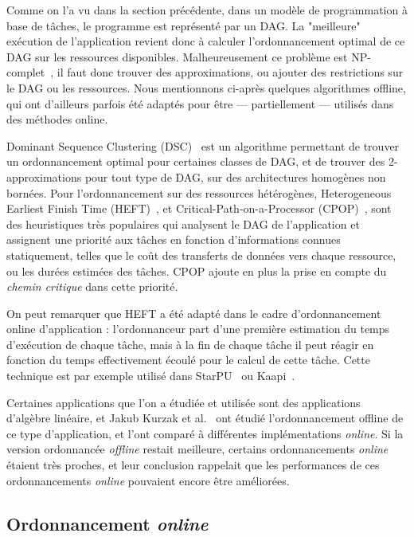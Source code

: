 Comme on l'a vu dans la section précédente, dans un modèle de programmation à base de tâches, le programme est représenté par un DAG.
La "meilleure" exécution de l'application revient donc à calculer l'ordonnancement optimal de ce DAG sur les ressources disponibles.
Malheureusement ce problème est NP-complet~\cite{Cook1971}, il faut donc trouver des approximations, ou ajouter des restrictions sur le DAG ou les ressources.
Nous mentionnons ci-après quelques algorithmes offline, qui ont d'ailleurs parfois été adaptés pour être --- partiellement --- utilisés dans des méthodes online.

Dominant Sequence Clustering (DSC)~\cite{Yang1994} est un algorithme permettant de trouver un ordonnancement optimal pour certaines classes de DAG, et de trouver des 2-approximations pour tout type de DAG, sur des architectures homogènes non bornées.
Pour l'ordonnancement sur des ressources hétérogènes, Heterogeneous Earliest Finish Time (HEFT)~\cite{HEFT}, et Critical-Path-on-a-Processor (CPOP)~\cite{HEFT}, sont des heuristiques très populaires qui analysent le DAG de l'application et assignent une priorité aux tâches en fonction d'informations connues statiquement, telles que le coût des transferts de données vers chaque ressource, ou les durées estimées des tâches.
CPOP ajoute en plus la prise en compte du \emph{chemin critique} dans cette priorité.

On peut remarquer que HEFT a été adapté dans le cadre d'ordonnancement online d'application : l'ordonnanceur part d'une première estimation du temps d'exécution de chaque tâche, mais à la fin de chaque tâche il peut réagir en fonction du temps effectivement écoulé pour le calcul de cette tâche. Cette technique est par exemple utilisé dans StarPU~\cite{StarPU} ou Kaapi~\cite{Lima2015}.

Certaines applications que l'on a étudiée et utilisée sont des applications d'algèbre linéaire, et Jakub Kurzak et al.~\cite{Kurzak2010} ont étudié l'ordonnancement offline de ce type d'application, et l'ont comparé à différentes implémentations \emph{online}.
Si la version ordonnancée \emph{offline} restait meilleure, certains ordonnancements \emph{online} étaient très proches, et leur conclusion rappelait que les performances de ces ordonnancements \emph{online} pouvaient encore être améliorées.



\subsection{Ordonnancement \emph{online}}

